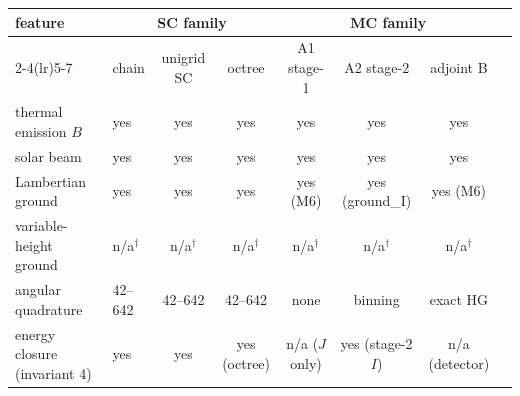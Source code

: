 \begin{tabular}{@{}llcccccc@{}}
\toprule
feature & \multicolumn{3}{c}{SC family} & \multicolumn{3}{c}{MC family} \\
\cmidrule(lr){2-4}\cmidrule(lr){5-7}
 & chain & unigrid SC & octree & A1 stage-1 & A2 stage-2 & adjoint B \\
\midrule
thermal emission $B$ & yes & yes & yes & yes & yes & yes \\
solar beam & yes & yes & yes & yes & yes & yes \\
Lambertian ground & yes & yes & yes & yes (M6) & yes (ground\_I) & yes (M6) \\
variable-height ground & n/a$^\dagger$ & n/a$^\dagger$ & n/a$^\dagger$ & n/a$^\dagger$ & n/a$^\dagger$ & n/a$^\dagger$ \\
angular quadrature & 42--642 & 42--642 & 42--642 & none & binning & exact HG \\
energy closure (invariant 4) & yes & yes & yes (octree) & n/a ($J$ only) & yes (stage-2 $I$) & n/a (detector) \\
\bottomrule
\end{tabular}
